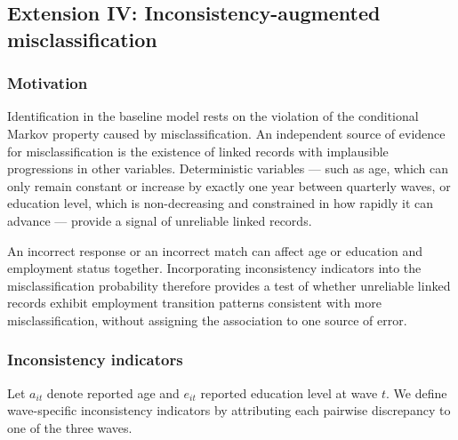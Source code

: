 \subsection{Extension IV: Inconsistency-augmented misclassification}
\label{sec:inconsistencies}

\subsubsection{Motivation}

Identification in the baseline model rests on the violation of the
conditional Markov property caused by misclassification. An independent
source of evidence for misclassification is the existence of linked records
with implausible progressions in other variables.
Deterministic variables --- such as age, which can only remain constant
or increase by exactly one year between quarterly waves, or education
level, which is non-decreasing and constrained in how rapidly it can
advance --- provide a signal of unreliable linked records.

An incorrect response or an incorrect match can affect age or education and
employment status together. Incorporating inconsistency indicators into the
misclassification probability therefore provides a test of whether unreliable
linked records exhibit employment transition patterns consistent with more
misclassification, without assigning the association to one source of error.

\subsubsection{Inconsistency indicators}
\label{sec:incons_indicators}

Let \(a_{it}\) denote reported age and \(e_{it}\) reported education
level at wave \(t\). We define wave-specific inconsistency indicators
by attributing each pairwise discrepancy to one of the three waves.

